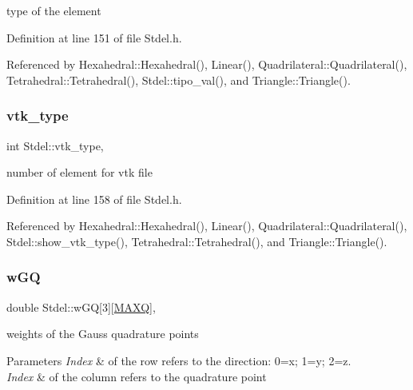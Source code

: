 type of the element 



Definition at line 151 of file Stdel.\+h.



Referenced by Hexahedral\+::\+Hexahedral(), Linear(), Quadrilateral\+::\+Quadrilateral(), Tetrahedral\+::\+Tetrahedral(), Stdel\+::tipo\+\_\+val(), and Triangle\+::\+Triangle().

\mbox{\label{classStdel_a55624584790a08437c03540489d04898}} 
\subsubsection{\texorpdfstring{vtk\+\_\+type}{vtk\_type}}
{\footnotesize\ttfamily int Stdel\+::vtk\+\_\+type\hspace{0.3cm}{\ttfamily [protected]}, {\ttfamily [inherited]}}



number of element for vtk file 



Definition at line 158 of file Stdel.\+h.



Referenced by Hexahedral\+::\+Hexahedral(), Linear(), Quadrilateral\+::\+Quadrilateral(), Stdel\+::show\+\_\+vtk\+\_\+type(), Tetrahedral\+::\+Tetrahedral(), and Triangle\+::\+Triangle().

\mbox{\label{classStdel_af99d72cbda49c30e23e83705c95a1c5b}} 
\subsubsection{\texorpdfstring{w\+GQ}{wGQ}}
{\footnotesize\ttfamily double Stdel\+::w\+GQ\mbox{[}3\mbox{]}\mbox{[}\hyperlink{MyOptions_8h_af708e94d886ba3f59582612949cac702}{M\+A\+XQ}\mbox{]}\hspace{0.3cm}{\ttfamily [protected]}, {\ttfamily [inherited]}}

weights of the Gauss quadrature points 
\begin{DoxyParams}{Parameters}
{\em Index} & of the row refers to the direction\+: 0=x; 1=y; 2=z. \\
\hline
{\em Index} & of the column refers to the quadrature point \\
\hline
\end{DoxyParams}


